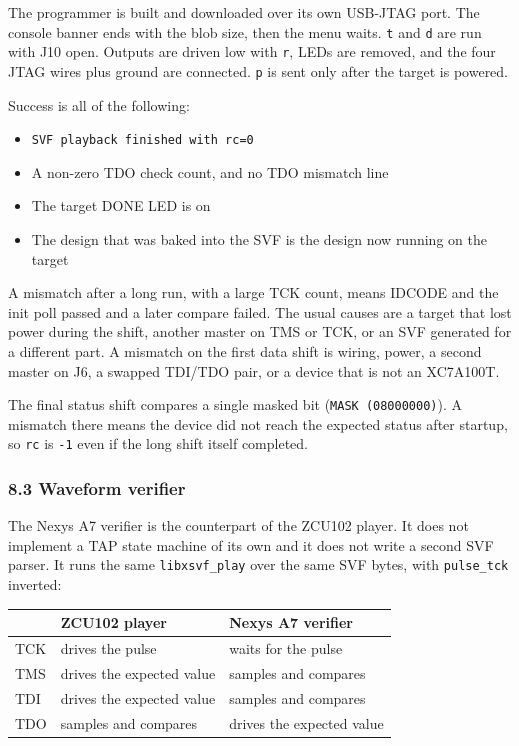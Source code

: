 \documentclass[
  11pt,
  a4paper,
]{article}
\newcounter{none} %
\providecommand{\tightlist}{%
  \setlength{\itemsep}{0pt}\setlength{\parskip}{0pt}}
\begin{document}
The programmer is built and downloaded over its own USB-JTAG port. The
console banner ends with the blob size, then the menu waits. \texttt{t}
and \texttt{d} are run with J10 open. Outputs are driven low with
\texttt{r}, LEDs are removed, and the four JTAG wires plus ground are
connected. \texttt{p} is sent only after the target is powered.

Success is all of the following:

\begin{itemize}
\tightlist
\item
  \texttt{SVF\ playback\ finished\ with\ rc=0}
\item
  A non-zero TDO check count, and no TDO mismatch line
\item
  The target DONE LED is on
\item
  The design that was baked into the SVF is the design now running on
  the target
\end{itemize}

A mismatch after a long run, with a large TCK count, means IDCODE and
the init poll passed and a later compare failed. The usual causes are a
target that lost power during the shift, another master on TMS or TCK,
or an SVF generated for a different part. A mismatch on the first data
shift is wiring, power, a second master on J6, a swapped TDI/TDO pair,
or a device that is not an XC7A100T.

The final status shift compares a single masked bit
(\texttt{MASK\ (08000000)}). A mismatch there means the device did not
reach the expected status after startup, so \texttt{rc} is \texttt{-1}
even if the long shift itself completed.

\subsubsection{8.3 Waveform verifier}\label{waveform-verifier}

The Nexys A7 verifier is the counterpart of the ZCU102 player. It does
not implement a TAP state machine of its own and it does not write a
second SVF parser. It runs the same \texttt{libxsvf\_play} over the same
SVF bytes, with \texttt{pulse\_tck} inverted:

{\def\LTcaptype{none} %
\begin{longtable}[]{@{}lll@{}}
\toprule\noalign{}
& ZCU102 player & Nexys A7 verifier \\
\midrule\noalign{}
\endhead
\bottomrule\noalign{}
\endlastfoot
TCK & drives the pulse & waits for the pulse \\
TMS & drives the expected value & samples and compares \\
TDI & drives the expected value & samples and compares \\
TDO & samples and compares & drives the expected value \\
\end{longtable}
}
\end{document}
